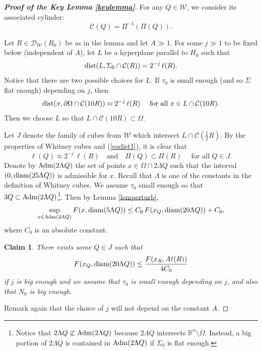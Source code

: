 \documentclass[11pt]{amsart}
\newcommand{\R}{{\mathbb R}}       %
\newcommand{\DD}{{\mathcal D}}
\newcommand{\WW}{{\mathcal W}}
\newcommand{\CC}{{\mathcal C}}
\newcommand{\diam}{{\rm diam}}
\newcommand{\dist}{{\rm dist}}
\newcommand{\rf}[1]{{(\ref{#1})}}
\newtheorem*{claim*}{Claim}
\theoremstyle{definition}
\theoremstyle{remark}
\numberwithin{equation}{section}
\begin{document}
\begin{proof}[\bf Proof of the Key Lemma \ref{keylemma}]
For any $Q\in\WW$, we consider its associated cylinder:
$$\CC(Q) = \Pi^{-1}(\Pi(Q)).$$

Let $R\in \DD_\WW(R_0)$ be as in the lemma and let $A\gg1$.
For some $j\gg1$ to be fixed below (independent of $A$), 
let $L$ be a hyperplane parallel to $H_0$ such that
$$\dist(L,\Sigma_0\cap \CC(R)) = 2^{-j}\,\ell(R).$$
Notice that there are two possible choices for $L$.
If $\tau_0$ is small enough (and so $\Sigma$ flat enough) depending on $j$, then
\begin{equation}\label{eqdist1}
\dist(x,\partial\Omega\cap \CC(10R))\approx 2^{-j}\,\ell(R)\quad\mbox{ for all $x\in L\cap \CC(10R)$.}
\end{equation}
Then we choose $L$ so that $L\cap \CC(10R)\subset \Omega$.

Let $J$ denote the family of cubes from $\WW$ which intersect $L\cap \CC(\frac12R)$. 
By the properties of Whitney cubes and \rf{eqdist1}, it is clear that
$$\ell(Q)\approx 2^{-j}\,\ell(R)\quad \text{and} \quad \Pi(Q)\subset\Pi(R)
\quad\mbox{ for all $Q\in J$.}$$
Denote by ${\rm Adm}(2\Lambda Q)$ the set of points  
$x\in \Omega\cap 2\Lambda Q$ such that the interval $(0,\diam(25\Lambda Q))$ is admissible for $x$.
Recall that $\Lambda$ is one of the constants in the definition of Whitney cubes.
We assume $\tau_0$ small enough so that $3Q\subset {\rm Adm}(2\Lambda Q)$\footnote{Notice
that $2\Lambda Q\not\subset{\rm Adm}(2\Lambda Q)$ because $2\Lambda Q$ intersects $\R^n\setminus
\overline\Omega$. Instead, a big portion of $2\Lambda Q$ is contained in ${\rm Adm}(2\Lambda Q)$ if $\Sigma_0$ is flat enough.}.
Then by Lemma \ref{lemperturb}, 
\begin{equation}\label{eqpert1}
\sup_{x\in {\rm Adm}(2\Lambda Q)} F(x,\diam(5\Lambda Q))\leq C_0\,F(x_Q,\diam(20\Lambda Q)) + C_0,
\end{equation}
where $C_0$ is an absolute constant.


\begin{claim*}
There exists some $Q\in J$ such that 
\begin{equation}\label{eqclaim49}
F(x_Q,\diam(20\Lambda Q))\leq \frac{F(x_R,A\ell(R))}{4C_0}
\end{equation}
if $j$ is big enough and
we assume that $\tau_0$ is small enough depending on $j$, and also that $N_0$ is big enough.
\end{claim*}

Remark again that the choice of $j$ will not depend on the constant $A$.


\end{proof}
\end{document}
